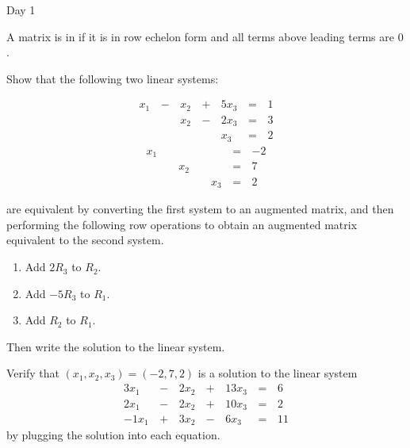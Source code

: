 \begin{applicationActivities}{Day 1}
\begin{definition}
  A matrix is in  if it is in row echelon form
  and all terms above leading terms are \(0\).
\end{definition}

\begin{activity}{0}
  Show that the following two linear systems:
  \begin{multicols}{2}\noindent
    \begin{alignat*}{4}
       x_1 &\,-\,&  x_2  &\,+\,&  5x_3 &\,=\,& 1 \\
           &\, \,&  x_2 &\,-\,&  2x_3 &\,=\,& 3 \\
           &\, \,&      &\, \,&   x_3 &\,=\,& 2
    \end{alignat*}
      \begin{alignat*}{4}
         x_1 &\, \,&      &\, \,&       &\,=\,& -2 \\
             &\, \,&  x_2 &\, \,&       &\,=\,& 7 \\
             &\, \,&      &\, \,&   x_3 &\,=\,& 2
      \end{alignat*}
  \end{multicols}
  are equivalent by converting the first system to an augmented matrix,
  and then performing the following row operations to obtain
  an augmented matrix equivalent to the second system.
  \begin{enumerate}
    \item Add \(2R_3\) to \(R_2\).
    \item Add \(-5R_3\) to \(R_1\).
    \item Add \(R_2\) to \(R_1\).
  \end{enumerate}
  Then write the solution to the linear system.
\end{activity}

\begin{activity}{0}
  Verify that \((x_1,x_2,x_3)=(-2,7,2)\) is a solution to the linear system
    \begin{alignat*}{4}
      3x_1 &\,-\,& 2x_2 &\,+\,& 13x_3 &\,=\,& 6 \\
      2x_1 &\,-\,& 2x_2 &\,+\,& 10x_3 &\,=\,& 2 \\
     -1x_1 &\,+\,& 3x_2 &\,-\,&  6x_3 &\,=\,& 11
    \end{alignat*}
  by plugging the solution into each equation.
\end{activity}


\end{applicationActivities}
